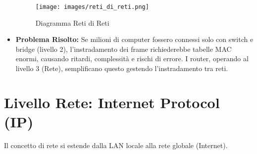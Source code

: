 \begin{itemize}
\begin{itemize}
    \end{itemize}
    \begin{figure}[H]
        \centering
        \texttt{[image: images/reti\_di\_reti.png]}
        \caption{Diagramma Reti di Reti}
    \end{figure}
    \item \textbf{Problema Risolto:} Se milioni di computer fossero connessi solo con switch e bridge (livello 2), l'instradamento dei frame richiederebbe tabelle MAC enormi, causando ritardi, complessità e rischi di errore. I router, operando al livello 3 (Rete), semplificano questo gestendo l'instradamento tra reti.
\end{itemize}

\section{Livello Rete: Internet Protocol (IP)}
Il concetto di rete si estende dalla LAN locale alla rete globale (Internet).
